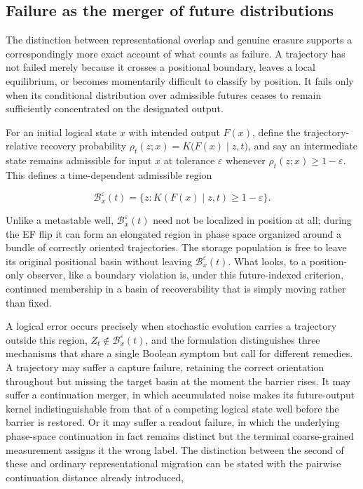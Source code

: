 \documentclass[11pt]{article}
\begin{document}
\subsection{Failure as the merger of future distributions}

The distinction between representational overlap and genuine erasure supports a correspondingly more exact account of what counts as failure. A trajectory has not failed merely because it crosses a positional boundary, leaves a local equilibrium, or becomes momentarily difficult to classify by position. It fails only when its conditional distribution over admissible futures ceases to remain sufficiently concentrated on the designated output.

For an initial logical state $x$ with intended output $F(x)$, define the trajectory-relative recovery probability $\rho_t(z;x) = K\bigl(F(x)\mid z,t\bigr)$, and say an intermediate state remains admissible for input $x$ at tolerance $\varepsilon$ whenever $\rho_t(z;x)\ge1-\varepsilon$. This defines a time-dependent admissible region

\[
\mathcal B_x^\varepsilon(t) = \bigl\{z : K(F(x)\mid z,t)\ge 1-\varepsilon\bigr\}.
\]

Unlike a metastable well, $\mathcal B_x^\varepsilon(t)$ need not be localized in position at all; during the EF flip it can form an elongated region in phase space organized around a bundle of correctly oriented trajectories. The storage population is free to leave its original positional basin without leaving $\mathcal B_x^\varepsilon(t)$. What looks, to a position-only observer, like a boundary violation is, under this future-indexed criterion, continued membership in a basin of recoverability that is simply moving rather than fixed.

A logical error occurs precisely when stochastic evolution carries a trajectory outside this region, $Z_t\notin\mathcal B_x^\varepsilon(t)$, and the formulation distinguishes three mechanisms that share a single Boolean symptom but call for different remedies. A trajectory may suffer a capture failure, retaining the correct orientation throughout but missing the target basin at the moment the barrier rises. It may suffer a continuation merger, in which accumulated noise makes its future-output kernel indistinguishable from that of a competing logical state well before the barrier is restored. Or it may suffer a readout failure, in which the underlying phase-space continuation in fact remains distinct but the terminal coarse-grained measurement assigns it the wrong label. The distinction between the second of these and ordinary representational migration can be stated with the pairwise continuation distance already introduced,
\end{document}
